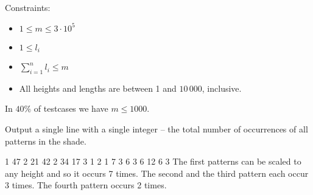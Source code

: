 Constraints:
\begin{itemize}\itemsep -2pt
\item
$1 \leq m \leq 3\cdot10^5$
\item
$1 \leq l_i$
\item
$\sum^{n}_{i=1} l_i \leq m$
\item
All heights and lengths are between 1 and $10\,000$, inclusive.
\end{itemize}

\smallskip

In $40\%$ of testcases we have $m \leq 1000$.


Output a single line with a single integer
-- the total number of occurrences of all patterns in the shade.


1 47
2 21 42
2 34 17
3 1 2 1
7 3 6 3 6 12 6 3
\sampleCOMMENT
The first patterns can be scaled to any height and so it occurs 7 times.
The second and the third pattern each occur 3 times.
The fourth pattern occurs 2 times.
\sampleEND



